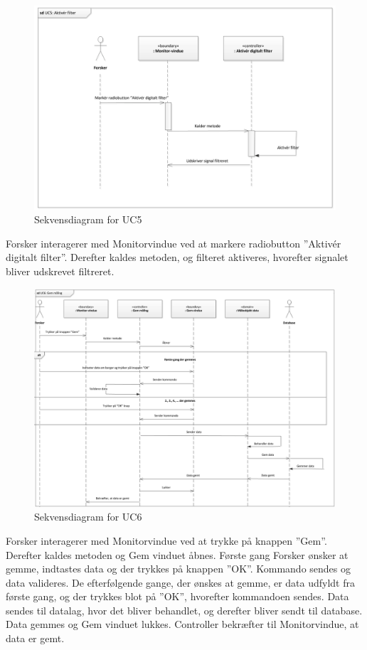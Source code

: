 \begin{figure}[H]
	\centering
	\includegraphics[width=1\textwidth]{Figurer/Snip20151104_35}
	\caption{Sekvensdiagram for UC5}
\end{figure}

Forsker interagerer med Monitorvindue ved at markere radiobutton ”Aktivér digitalt filter”. Derefter kaldes metoden, og filteret aktiveres, hvorefter signalet bliver udskrevet filtreret.

\begin{figure}[H]
	\centering
	\includegraphics[width=1\textwidth]{Figurer/Snip20151104_36}
	\caption{Sekvensdiagram for UC6}
\end{figure}

Forsker interagerer med Monitorvindue ved at trykke på knappen ”Gem”. Derefter kaldes metoden og Gem vinduet åbnes. Første gang Forsker ønsker at gemme, indtastes data og der trykkes på knappen ”OK”. Kommando sendes og data valideres. De efterfølgende gange, der ønskes at gemme, er data udfyldt fra første gang, og der trykkes blot på ”OK”, hvorefter kommandoen sendes. Data sendes til datalag, hvor det bliver behandlet, og derefter bliver sendt til database. Data gemmes og Gem vinduet lukkes. Controller bekræfter til Monitorvindue, at data er gemt.

